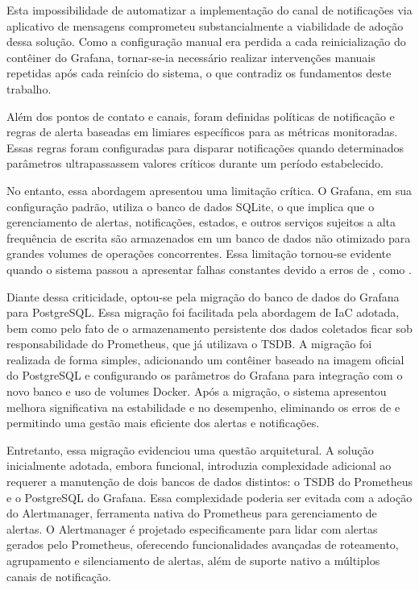Esta impossibilidade de automatizar a implementação do canal de notificações via aplicativo de mensagens comprometeu substancialmente a viabilidade de adoção dessa solução. Como a configuração manual era perdida a cada reinicialização do contêiner do Grafana, tornar-se-ia necessário realizar intervenções manuais repetidas após cada reinício do sistema, o que contradiz os fundamentos deste trabalho.

Além dos pontos de contato e canais, foram definidas políticas de notificação e regras de alerta baseadas em limiares específicos para as métricas monitoradas. Essas regras foram configuradas para disparar notificações quando determinados parâmetros ultrapassassem valores críticos durante um período estabelecido.

No entanto, essa abordagem apresentou uma limitação crítica. O Grafana, em sua configuração padrão, utiliza o banco de dados SQLite, o que implica que o gerenciamento de alertas, notificações, estados,  e outros serviços sujeitos a alta frequência de escrita são armazenados em um banco de dados não otimizado para grandes volumes de operações concorrentes. Essa limitação tornou-se evidente quando o sistema passou a apresentar falhas constantes devido a erros de , como .

Diante dessa criticidade, optou-se pela migração do banco de dados do Grafana para PostgreSQL. Essa migração foi facilitada pela abordagem de IaC adotada, bem como pelo fato de o armazenamento persistente dos dados coletados ficar sob responsabilidade do Prometheus, que já utilizava o TSDB. A migração foi realizada de forma simples, adicionando um contêiner baseado na imagem oficial do PostgreSQL e configurando os parâmetros do Grafana para integração com o novo banco e uso de volumes Docker. Após a migração, o sistema apresentou melhora significativa na estabilidade e no desempenho, eliminando os erros de  e permitindo uma gestão mais eficiente dos alertas e notificações.

Entretanto, essa migração evidenciou uma questão arquitetural. A solução inicialmente adotada, embora funcional, introduzia complexidade adicional ao requerer a manutenção de dois bancos de dados distintos: o TSDB do Prometheus e o PostgreSQL do Grafana. Essa complexidade poderia ser evitada com a adoção do Alertmanager, ferramenta nativa do Prometheus para gerenciamento de alertas. O Alertmanager é projetado especificamente para lidar com alertas gerados pelo Prometheus, oferecendo funcionalidades avançadas de roteamento, agrupamento e silenciamento de alertas, além de suporte nativo a múltiplos canais de notificação.

